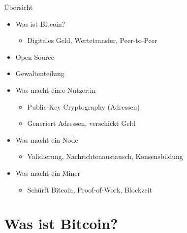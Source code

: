 \documentclass[aspectratio=169,t,11pt]{beamer}
\begin{document}
\begin{frame}
	\titlepage
\end{frame}

\begin{frame}{Übersicht}
	\begin{itemize}
		\item Was ist Bitcoin?
		      \begin{itemize}
			      \item Digitales Geld, Wertetransfer, Peer-to-Peer
		      \end{itemize}
		\item Open Source
		\item Gewaltenteilung
		\item Was macht ein:e Nutzer:in
		      \begin{itemize}
			      \item Public-Key Cryptography (Adressen)
			      \item Generiert Adressen, verschickt Geld
		      \end{itemize}
		\item Was macht ein Node
		      \begin{itemize}
			      \item Validierung, Nachrichtenaustausch, Konsensbildung
		      \end{itemize}
		\item Was macht ein Miner
		      \begin{itemize}
			      \item Schürft Bitcoin, Proof-of-Work, Blockzeit
		      \end{itemize}
	\end{itemize}
\end{frame}

\section{Was ist Bitcoin?}
\end{document}

